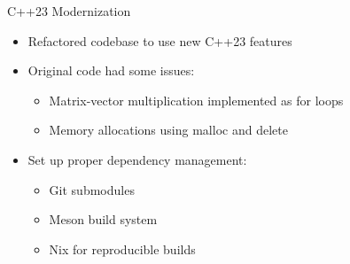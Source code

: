 \documentclass[aspectratio=169]{beamer}
\begin{document}
\begin{frame}{C++23 Modernization}
    \begin{itemize}[<+->]
        \item Refactored codebase to use new C++23 features
        \item Original code had some issues:
              \begin{itemize}
                  \item Matrix-vector multiplication implemented as for loops
                  \item Memory allocations using malloc and delete
              \end{itemize}
        \item Set up proper dependency management:
              \begin{itemize}
                  \item Git submodules
                  \item Meson build system
                  \item Nix for reproducible builds
              \end{itemize}
    \end{itemize}

\end{frame}
\end{document}
